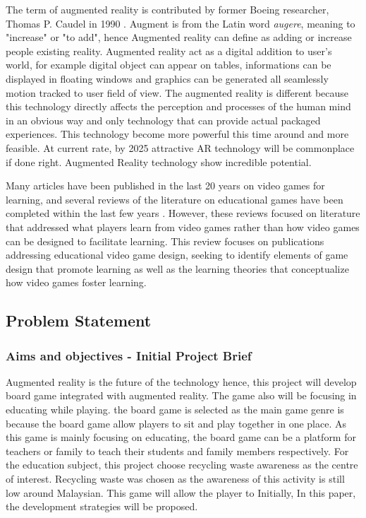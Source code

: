 \documentclass[12pt]{article}
\begin{document}
The term of augmented reality is contributed by former Boeing researcher, Thomas P. Caudel in 1990 \cite{lee2012augmented}. Augment is from the Latin word \textit{augere}, meaning to "increase" or "to add", hence Augmented reality can define as adding or increase people existing reality. Augmented reality act as a digital addition to user's world, for example digital object can appear on tables, informations can be displayed in floating windows and graphics can be generated all seamlessly motion tracked to user field of view. The augmented reality is different because this technology directly affects the perception and processes of the human mind in an obvious way and only technology that can provide actual packaged experiences. This technology become more powerful this time around and more feasible. At current rate, by 2025 attractive AR technology will be commonplace if done right. Augmented Reality technology show incredible potential.

\par

Many articles have been published in the last 20 years on video games for learning, and several reviews of the literature on educational games have been completed within the last few years . However, these reviews focused on literature that addressed what players learn from video games rather than how video games can be designed to facilitate learning. This review focuses on publications addressing educational video game design, seeking to identify elements of game design that promote learning as well as the learning theories that conceptualize how video games foster learning.

\subsection{Problem Statement}

\subsubsection{Aims and objectives - Initial Project Brief}

Augmented reality is the future of the technology hence, this project will develop board game integrated with augmented reality. The game also will be focusing in educating while playing. the board game is selected as the main game genre is because the board game allow players to sit and play together in one place. As this game is mainly focusing on educating, the board game can be a platform for teachers or family to teach their students and family members respectively. For the education subject, this project choose recycling waste awareness as the centre of interest. Recycling waste was chosen as the awareness of this activity is still low around Malaysian. This game will allow the player to Initially, In this paper, the development strategies will be proposed.
\end{document}
